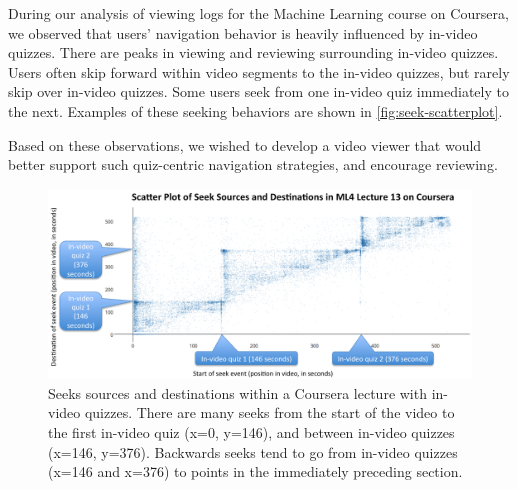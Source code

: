 \documentclass{chi-ext}
\begin{document}
During our analysis of viewing logs for the Machine Learning course on Coursera, we observed that users' navigation behavior is heavily influenced by in-video quizzes. There are peaks in viewing and reviewing surrounding in-video quizzes. Users often skip forward within video segments to the in-video quizzes, but rarely skip over in-video quizzes. Some users seek from one in-video quiz immediately to the next. Examples of these seeking behaviors are shown in \autoref{fig:seek-scatterplot}.

Based on these observations, we wished to develop a video viewer that would better support such quiz-centric navigation strategies, and encourage reviewing.

\begin{figure}
\includegraphics[width=\columnwidth]{seek-scatterplot}
\caption{Seeks sources and destinations within a Coursera lecture with in-video quizzes. There are many seeks from the start of the video to the first in-video quiz (x=0, y=146), and between in-video quizzes (x=146, y=376). Backwards seeks tend to go from in-video quizzes (x=146 and x=376) to points in the immediately preceding section.}
\label{fig:seek-scatterplot}
\end{figure}


\end{document}
